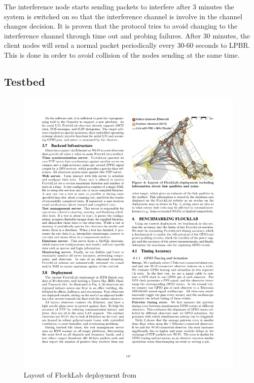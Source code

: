 The interference node starts sending packets to interfere after 3 minutes the system is switched on so that the interference channel is involve in the channel changes decision. It is proven that the protocol tries to avoid changing to the interference channel through time out and probing failures. After 30 minutes, the client nodes will send a normal packet periodically every 30-60 seconds to LPBR. This is done in order to avoid collision of the nodes sending at the same time. 


\subsection{Testbed}

\begin{figure}
\centering
\includegraphics[trim=0cm 0cm 0cm 0cm, clip=true, totalheight=0.33\textheight]
{flocklabLayout.pdf}
\caption{Layout of FlockLab deployment from \cite{flocklab}}
\label{fig_flocklab}
\end{figure}

